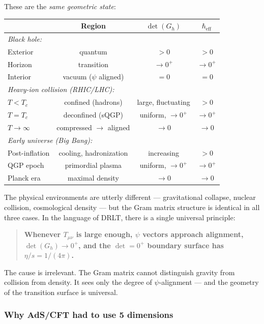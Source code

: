\documentclass[12pt]{article}
\theoremstyle{remark}
\theoremstyle{definition}
\begin{document}
These are the \emph{same geometric state}:

\begin{center}
\begin{tabular}{lccc}
\hline
& Region & $\det(G_h)$ & $\hbar_\text{eff}$ \\
\hline
\multicolumn{4}{l}{\emph{Black hole:}} \\
\quad Exterior & quantum & $> 0$ & $> 0$ \\
\quad Horizon & transition & $\to 0^+$ & $\to 0^+$ \\
\quad Interior & vacuum ($\psi$ aligned) & $= 0$ & $= 0$ \\
\hline
\multicolumn{4}{l}{\emph{Heavy-ion collision (RHIC/LHC):}} \\
\quad $T < T_c$ & confined (hadrons) & large, fluctuating & $> 0$ \\
\quad $T = T_c$ & deconfined (sQGP) & uniform, $\to 0^+$ & $\to 0^+$ \\
\quad $T \to \infty$ & compressed $\to$ aligned & $\to 0$ & $\to 0$ \\
\hline
\multicolumn{4}{l}{\emph{Early universe (Big Bang):}} \\
\quad Post-inflation & cooling, hadronization & increasing & $> 0$ \\
\quad QGP epoch & primordial plasma & uniform, $\to 0^+$ & $\to 0^+$ \\
\quad Planck era & maximal density & $\to 0$ & $\to 0$ \\
\hline
\end{tabular}
\end{center}

The physical environments are utterly different --- gravitational collapse, nuclear collision, cosmological density --- but the Gram matrix structure is identical in all three cases. In the language of DRLT, there is a single universal principle:

\begin{quote}
\textbf{Whenever $T_{\mu\nu}$ is large enough, $\psi$ vectors approach alignment, $\det(G_h) \to 0^+$, and the $\det = 0^+$ boundary surface has $\eta/s = 1/(4\pi)$.}
\end{quote}

The cause is irrelevant. The Gram matrix cannot distinguish gravity from collision from density. It sees only the degree of $\psi$-alignment --- and the geometry of the transition surface is universal.

\subsubsection{Why AdS/CFT had to use 5 dimensions}
\end{document}
